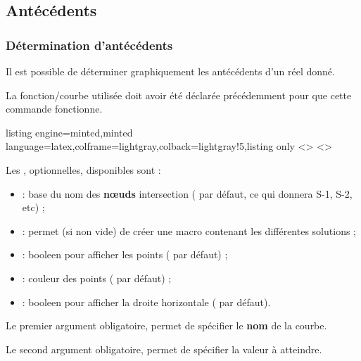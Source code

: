 \documentclass[11pt,a4paper]{ltxdoc}
\begin{document}
\pagebreak

\subsection{Antécédents}

\subsubsection{Détermination d'antécédents}\label{defanteced}

Il est possible de déterminer graphiquement les antécédents d'un réel donné.

La fonction/courbe utilisée doit avoir été déclarée précédemment pour que cette commande fonctionne.

\begin{tcblisting}{listing engine=minted,minted language=latex,colframe=lightgray,colback=lightgray!5,listing only}
<\myantec>
<\myantec>
\end{tcblisting}

Les \MontreCode{[clés]}, optionnelles, disponibles sont :

\smallskip

\begin{itemize}
  \item {} : base du nom des \textbf{nœuds} intersection ( par défaut, ce qui donnera \textsf{S-1}, \textsf{S-2}, etc) ;
  \item {} : permet (si non vide) de créer une macro contenant les différentes solutions ;
  \item {} : booleen pour afficher les points ( par défaut) ;
  \item {} : couleur des points ( par défaut) ;
  \item {} : booleen pour afficher la droite horizontale ( par défaut).
\end{itemize}

\smallskip

Le premier argument obligatoire, permet de spécifier le \textbf{nom} de la courbe.

\smallskip

Le second argument obligatoire, permet de spécifier la valeur à atteindre.

\smallskip
\end{document}
